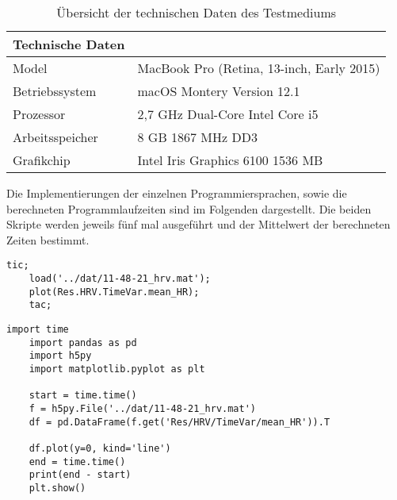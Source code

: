 \begin{table}
	\centering
	\begin{tabular}{|l|l|}
		\multicolumn{1}{l}{\textbf{Technische Daten}} & \multicolumn{1}{l}{}                       \\ 
		\hline
		Model                                         & MacBook Pro (Retina, 13-inch, Early 2015)  \\ 
		\hline
		Betriebssystem                                & macOS Montery Version 12.1                 \\ 
		\hline
		Prozessor                                     & 2,7 GHz Dual-Core Intel Core i5            \\ 
		\hline
		Arbeitsspeicher                               & 8 GB 1867 MHz DD3                          \\ 
		\hline
		Grafikchip                                    & Intel Iris Graphics 6100 1536 MB           \\
		\hline
	\end{tabular}
	\caption{Übersicht der technischen Daten des Testmediums}
\end{table}

Die Implementierungen der einzelnen Programmiersprachen, sowie die berechneten Programmlaufzeiten sind im Folgenden dargestellt. Die beiden Skripte werden jeweils fünf mal ausgeführt und der Mittelwert der berechneten Zeiten bestimmt.

\begin{lstlisting}[caption=MATLAB Implementierung,label=matlabImpl]
	tic;
	load('../dat/11-48-21_hrv.mat');
	plot(Res.HRV.TimeVar.mean_HR);
	tac;
\end{lstlisting}
\begin{lstlisting}[caption=Python Implementierung,label=pythonImpl]
	import time
	import pandas as pd
	import h5py
	import matplotlib.pyplot as plt
	
	start = time.time()
	f = h5py.File('../dat/11-48-21_hrv.mat')
	df = pd.DataFrame(f.get('Res/HRV/TimeVar/mean_HR')).T
	
	df.plot(y=0, kind='line')
	end = time.time()
	print(end - start)
	plt.show()
\end{lstlisting}

